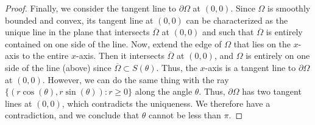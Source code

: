 \documentclass{amsart}
\theoremstyle{definition}
\begin{document}
\begin{proof}
Finally, we consider the tangent line to $\partial\Omega$ at $(0,0)$. Since $\Omega$ is smoothly bounded and convex, its tangent line at $(0,0)$ can be characterized as the unique line in the plane that intersects $\overline{\Omega}$ at $(0,0)$ and such that $\overline{\Omega}$ is entirely contained on one side of the line. Now, extend the edge of $\Omega$ that lies on the $x$-axis to the entire $x$-axis. Then it intersects $\overline{\Omega}$ at $(0,0)$, and $\Omega$ is entirely on one side of the line (above) since $\overline{\Omega} \subset S(\theta)$. Thus, the $x$-axis is a tangent line to $\partial\Omega$ at $(0,0)$. However, we can do the same thing with the ray $\{(r\cos(\theta), r\sin(\theta)) : r \geq 0\}$ along the angle $\theta$. Thus, $\partial\Omega$ has two tangent lines at $(0,0)$, which contradicts the uniqueness. We therefore have a contradiction, and we conclude that $\theta$ cannot be less than $\pi$.
\end{proof}
\end{document}
